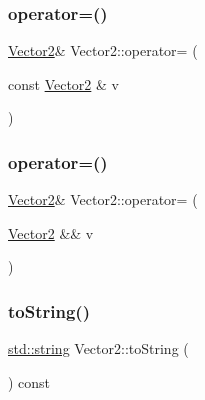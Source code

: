 \mbox{\label{class_vector2_a1df081c36e002f10ac92c957c6731065}} 
\subsubsection{\texorpdfstring{operator=()}{operator=()}\hspace{0.1cm}{\footnotesize\ttfamily [1/2]}}
{\footnotesize\ttfamily \mbox{\hyperlink{class_vector2}{Vector2}}\& Vector2\+::operator= (\begin{DoxyParamCaption}\item[{const \mbox{\hyperlink{class_vector2}{Vector2}} \&}]{v }\end{DoxyParamCaption})\hspace{0.3cm}{\ttfamily [inline]}}

\mbox{\label{class_vector2_a07657e6cb1e58fe0b3d152c04eadee85}} 
\subsubsection{\texorpdfstring{operator=()}{operator=()}\hspace{0.1cm}{\footnotesize\ttfamily [2/2]}}
{\footnotesize\ttfamily \mbox{\hyperlink{class_vector2}{Vector2}}\& Vector2\+::operator= (\begin{DoxyParamCaption}\item[{\mbox{\hyperlink{class_vector2}{Vector2}} \&\&}]{v }\end{DoxyParamCaption})\hspace{0.3cm}{\ttfamily [inline]}}

\mbox{\label{class_vector2_ab37ebfc71ac92a8e763a386828835ee1}} 
\subsubsection{\texorpdfstring{toString()}{toString()}}
{\footnotesize\ttfamily \mbox{\hyperlink{_s_d_l__opengl__glext_8h_ab4ccfaa8ab0e1afaae94dc96ef52dde1}{std\+::string}} Vector2\+::to\+String (\begin{DoxyParamCaption}{ }\end{DoxyParamCaption}) const\hspace{0.3cm}{\ttfamily [inline]}}



